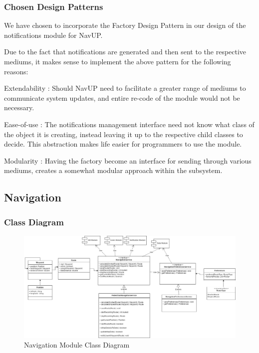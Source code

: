 \documentclass{article}
\begin{document}
        \subsubsection{Chosen Design Patterns}
		\begin{description}
		We have chosen to incorporate the Factory Design Pattern in our design of the notifications module for NavUP.
		
		Due to the fact that notifications are generated and then sent to the respective mediums, it makes sense to implement the above pattern for the following reasons:
		
		\item[$\bullet$]Extendability : Should NavUP need to facilitate a greater range of mediums to communicate system updates, and entire re-code of the module would not be necessary.
		
		\item[$\bullet$]Ease-of-use : The notifications management interface need not know what class of the object it is creating, instead leaving it up to the respective child classes to decide. This abstraction makes life easier for programmers to use the module.
		
		\item[$\bullet$]Modularity : Having the factory become an interface for sending through various mediums, creates a somewhat modular approach within the subsystem.		
		\end{description}
		
    \subsection{Navigation}
        \subsubsection{Class Diagram}
        \begin{figure}[H]
        	\includegraphics[width=\textwidth]{Navigation_Class_Diagram}
            \caption{Navigation Module Class Diagram}
        \end{figure}
\end{document}
